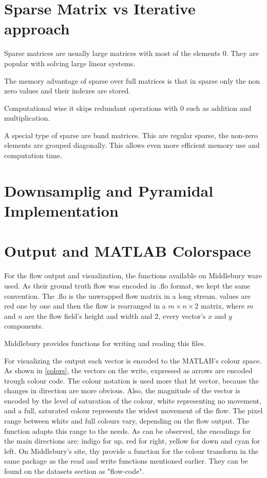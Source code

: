 \documentclass[12pt,a4paper,twoside]{report}
\begin{document}
\section{Sparse Matrix vs Iterative approach}

Sparse matrices are usually large matrices with most of the elements $0$. They are popular with solving large linear systems.

The memory advantage of sparse over full matrices is that in sparse only the non zero values and their indexes are stored. 

Computational wise it skips redundant operations with 0 such as addition and multiplication.

A special type of sparse are band matrices. This are regular sparse, the non-zero elements are grouped diagonally. This allows even more efficient memory use and computation time. 

\section{Downsamplig and Pyramidal Implementation}


\section{Output and MATLAB Colorspace}


For the flow output and visualization, the functions available on Middlebury ware used.
As their ground truth flow was encoded in .flo format, we kept the same convention. The .flo is the unwrapped flow matrix in a long stream. values are red one by one and then the flow is rearranged in a $m\times n \times 2$ matrix, where $m$ and $n$ are the flow field's height and width and 2, every vector's $x$ and $y$ components.

Middlebury\cite{middleburry} provides functions for writing and reading this files. 

For visualizing the output each vector is encoded to the MATLAB's colour space. As shown in \ref{colors}, the vectors on the write, expressed as arrows are encoded trough colour code. The colour notation is  used more that ht vector, because the changes in direction are more obvious. Also, the magnitude of the vector is encoded by the level of saturation of the colour, white representing no movement, and a full, saturated colour represents the widest movement of the flow. The pixel range between white and full colours vary, depending on the flow output. The function adapts this range to the needs. As can be observed, the encodings for the main directions are: indigo for up, red for right, yellow for down and cyan for left. On Middlebury's site, thy provide a function for the colour transform in the same package as the read and write functions mentioned earlier. They can be found on the datasets section as "flow-code".  
\end{document}
